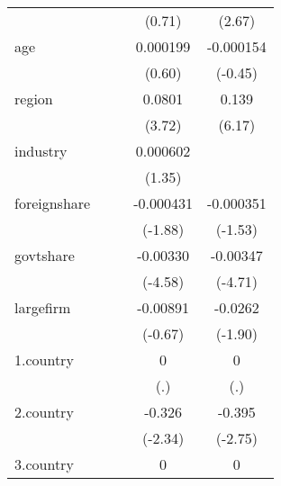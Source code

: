 {\begin{tabular}{l*{4}{c}}
            &                     &                     &      (0.71)         &      (2.67)         \\
[1em]
age         &                     &                     &    0.000199         &   -0.000154         \\
            &                     &                     &      (0.60)         &     (-0.45)         \\
[1em]
region      &                     &                     &      0.0801\sym{***}&       0.139\sym{***}\\
            &                     &                     &      (3.72)         &      (6.17)         \\
[1em]
industry    &                     &                     &    0.000602         &                     \\
            &                     &                     &      (1.35)         &                     \\
[1em]
foreignshare&                     &                     &   -0.000431         &   -0.000351         \\
            &                     &                     &     (-1.88)         &     (-1.53)         \\
[1em]
govtshare   &                     &                     &    -0.00330\sym{***}&    -0.00347\sym{***}\\
            &                     &                     &     (-4.58)         &     (-4.71)         \\
[1em]
largefirm   &                     &                     &    -0.00891         &     -0.0262         \\
            &                     &                     &     (-0.67)         &     (-1.90)         \\
[1em]
1.country   &                     &                     &           0         &           0         \\
            &                     &                     &         (.)         &         (.)         \\
[1em]
2.country   &                     &                     &      -0.326\sym{*}  &      -0.395\sym{**} \\
            &                     &                     &     (-2.34)         &     (-2.75)         \\
[1em]
3.country   &                     &                     &           0         &           0         \\

\end{tabular}}
